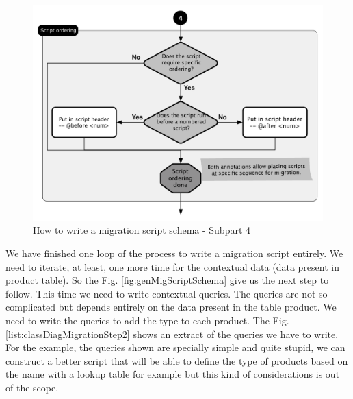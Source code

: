 \begin{figure}[h]
        \centering
        \includegraphics[scale=0.60]{images/mig-schema-gen-4.pdf}
        \caption{How to write a migration script schema - Subpart 4}
        \label{fig:genMigScriptSchema-4}
\end{figure}

We have finished one loop of the process to write a migration script entirely. We need to iterate, at least, one more time for the contextual data (data present in product table). So the Fig. \ref{fig:genMigScriptSchema} give us the next step to follow. This time we need to write contextual queries. The queries are not so complicated but depends entirely on the data present in the table product. We need to write the queries to add the type to each product. The Fig. \ref{list:classDiagMigrationStep2} shows an extract of the queries we have to write. For the example, the queries shown are specially simple and quite stupid, we can construct a better script that will be able to define the type of products based on the name with a lookup table for example but this kind of considerations is out of the scope.



